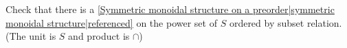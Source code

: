 
Check that there is a \ref{Symmetric monoidal structure on a preorder|symmetric monoidal structure|referenced} on the power set of $S$ ordered by subset relation. (The unit is $S$ and product is $\cap$)